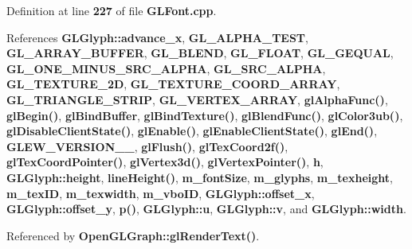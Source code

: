 Definition at line {\bf 227} of file {\bf G\+L\+Font.\+cpp}.



References {\bf G\+L\+Glyph\+::advance\+\_\+x}, {\bf G\+L\+\_\+\+A\+L\+P\+H\+A\+\_\+\+T\+E\+ST}, {\bf G\+L\+\_\+\+A\+R\+R\+A\+Y\+\_\+\+B\+U\+F\+F\+ER}, {\bf G\+L\+\_\+\+B\+L\+E\+ND}, {\bf G\+L\+\_\+\+F\+L\+O\+AT}, {\bf G\+L\+\_\+\+G\+E\+Q\+U\+AL}, {\bf G\+L\+\_\+\+O\+N\+E\+\_\+\+M\+I\+N\+U\+S\+\_\+\+S\+R\+C\+\_\+\+A\+L\+P\+HA}, {\bf G\+L\+\_\+\+S\+R\+C\+\_\+\+A\+L\+P\+HA}, {\bf G\+L\+\_\+\+T\+E\+X\+T\+U\+R\+E\+\_\+2D}, {\bf G\+L\+\_\+\+T\+E\+X\+T\+U\+R\+E\+\_\+\+C\+O\+O\+R\+D\+\_\+\+A\+R\+R\+AY}, {\bf G\+L\+\_\+\+T\+R\+I\+A\+N\+G\+L\+E\+\_\+\+S\+T\+R\+IP}, {\bf G\+L\+\_\+\+V\+E\+R\+T\+E\+X\+\_\+\+A\+R\+R\+AY}, {\bf gl\+Alpha\+Func()}, {\bf gl\+Begin()}, {\bf gl\+Bind\+Buffer}, {\bf gl\+Bind\+Texture()}, {\bf gl\+Blend\+Func()}, {\bf gl\+Color3ub()}, {\bf gl\+Disable\+Client\+State()}, {\bf gl\+Enable()}, {\bf gl\+Enable\+Client\+State()}, {\bf gl\+End()}, {\bf G\+L\+E\+W\+\_\+\+V\+E\+R\+S\+I\+O\+N\+\_\+\_}, {\bf gl\+Flush()}, {\bf gl\+Tex\+Coord2f()}, {\bf gl\+Tex\+Coord\+Pointer()}, {\bf gl\+Vertex3d()}, {\bf gl\+Vertex\+Pointer()}, {\bf h}, {\bf G\+L\+Glyph\+::height}, {\bf line\+Height()}, {\bf m\+\_\+font\+Size}, {\bf m\+\_\+glyphs}, {\bf m\+\_\+texheight}, {\bf m\+\_\+tex\+ID}, {\bf m\+\_\+texwidth}, {\bf m\+\_\+vbo\+ID}, {\bf G\+L\+Glyph\+::offset\+\_\+x}, {\bf G\+L\+Glyph\+::offset\+\_\+y}, {\bf p()}, {\bf G\+L\+Glyph\+::u}, {\bf G\+L\+Glyph\+::v}, and {\bf G\+L\+Glyph\+::width}.



Referenced by {\bf Open\+G\+L\+Graph\+::gl\+Render\+Text()}.



